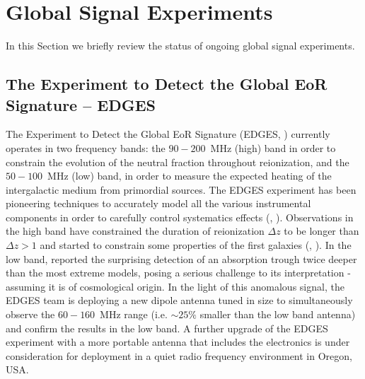 \section{Global Signal Experiments}

In this Section we briefly review the status of ongoing global signal experiments.  

\subsection{The Experiment to Detect the Global EoR Signature -- EDGES}
The Experiment to Detect the Global EoR Signature (EDGES, \cite{bowman08}) currently operates in two frequency bands: the $90-200$~MHz (high) band in order to constrain the evolution of the neutral fraction throughout reionization, and the $50-100$~MHz (low) band, in order to measure the expected heating of the intergalactic medium from primordial sources. 
The EDGES experiment has been pioneering techniques to accurately model all the various instrumental components in order to carefully control systematics effects (\cite{bowman08}, \cite{monsalve17a}). Observations in the high band have constrained the duration of reionization $\Delta z$ to be longer than $\Delta z >  1$ and started to constrain some properties of the first galaxies (\cite{monsalve17b}, \cite{monsalve18}). In the low band, \cite{bowman18} reported the surprising detection of an absorption trough twice deeper than the most extreme models, posing a serious challenge to its interpretation - assuming it is of cosmological origin. 
In the light of this anomalous signal, the EDGES team is deploying a new dipole antenna tuned in size to simultaneously observe the $60-160$~MHz range (i.e. $\sim 25\%$ smaller than the low band antenna) and confirm the results in the low band. A further upgrade of the EDGES experiment with a more portable antenna that includes the electronics is under consideration for deployment in a quiet radio frequency environment in Oregon, USA.




